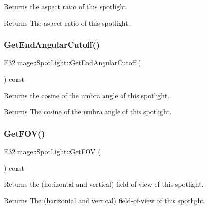 Returns the aspect ratio of this spotlight.

\begin{DoxyReturn}{Returns}
The aspect ratio of this spotlight. 
\end{DoxyReturn}
\hypertarget{classmage_1_1_spot_light_ad9c4cabf950619605a8040e41b9acb5b}{}\label{classmage_1_1_spot_light_ad9c4cabf950619605a8040e41b9acb5b} 
\subsubsection{\texorpdfstring{Get\+End\+Angular\+Cutoff()}{GetEndAngularCutoff()}}
{\footnotesize\ttfamily \hyperlink{namespacemage_aa97e833b45f06d60a0a9c4fc22ae02c0}{F32} mage\+::\+Spot\+Light\+::\+Get\+End\+Angular\+Cutoff (\begin{DoxyParamCaption}{ }\end{DoxyParamCaption}) const\hspace{0.3cm}{\ttfamily [noexcept]}}

Returns the cosine of the umbra angle of this spotlight.

\begin{DoxyReturn}{Returns}
The cosine of the umbra angle of this spotlight. 
\end{DoxyReturn}
\hypertarget{classmage_1_1_spot_light_a6cbc0ac77c28796cc25a7131bfe4a1c1}{}\label{classmage_1_1_spot_light_a6cbc0ac77c28796cc25a7131bfe4a1c1} 
\subsubsection{\texorpdfstring{Get\+F\+O\+V()}{GetFOV()}}
{\footnotesize\ttfamily \hyperlink{namespacemage_aa97e833b45f06d60a0a9c4fc22ae02c0}{F32} mage\+::\+Spot\+Light\+::\+Get\+F\+OV (\begin{DoxyParamCaption}{ }\end{DoxyParamCaption}) const\hspace{0.3cm}{\ttfamily [noexcept]}}

Returns the (horizontal and vertical) field-\/of-\/view of this spotlight.

\begin{DoxyReturn}{Returns}
The (horizontal and vertical) field-\/of-\/view of this spotlight. 
\end{DoxyReturn}
\hypertarget{classmage_1_1_spot_light_a3df0792c637a6167c7c596ce125abbe0}{}\label{classmage_1_1_spot_light_a3df0792c637a6167c7c596ce125abbe0} 
